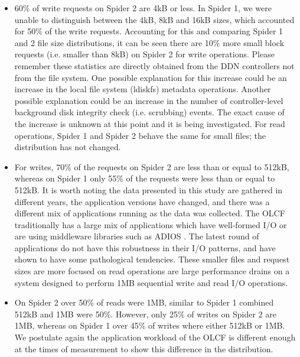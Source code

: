 \begin{itemize}

\item  60\% of write requests on Spider 2 are 4kB or less.  In Spider 1, we were
unable to distinguish between the 4kB, 8kB and 16kB sizes, which accounted for 50\%
of the write requests. Accounting for this and comparing Spider 1 and 2 file
size distributions, it can be seen there are 10\% more small block
requests (i.e.  smaller than 8kB) on Spider 2 for write operations. Please
remember these statistics are directly obtained from the DDN controllers not from the
file system. One possible explanation for this increase could be an increase in the local
file system (ldiskfs) metadata operations. Another possible explanation could be an
increase in the number of controller-level background disk integrity check 
(i.e. scrubbing) events.
The exact cause of the increase is unknown at this point and it is being
investigated.  For read operations, Spider 1 and Spider 2 behave the same for
small files; the distribution has not changed.

\item  For writes, 70\% of the requests on Spider 2 are less than or
equal to 512kB, whereas on Spider 1 only 55\% of the requests were less than
or equal to 512kB. It is worth noting the data presented in this study are
 gathered in
different years, the application versions have changed, and there was a
different mix of applications running as the data was collected. The OLCF
traditionally has a large mix of applications which have well-formed I/O or are
using middleware libraries such as ADIOS \cite{adios}. The latest round of
applications do not have this robustness in their I/O patterns, and have shown
to have some pathological tendencies. These smaller files and request sizes
are more focused on read operations are large performance drains on a
system designed to perform 1MB sequential write and read I/O
operations. 

\item On Spider 2 over 50\% of reads were 1MB, similar to Spider 1 combined
512kB and 1MB were 50\%. However, only 25\% of writes on Spider 2 are 1MB,
whereas on Spider 1 over 45\% of writes where either 512kB or 1MB. We postulate
again the application workload of the OLCF is different enough at the
times of measurement to show this difference in the distribution.


\end{itemize}
